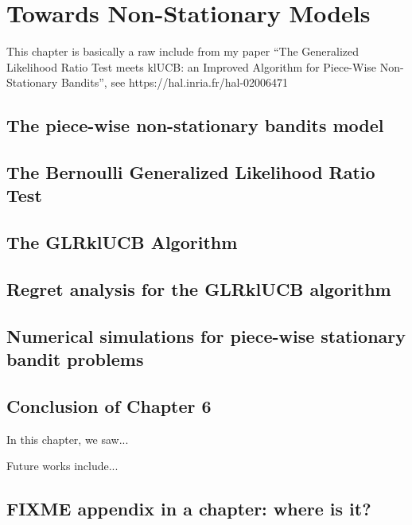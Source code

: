 

\chapter{Towards Non-Stationary Models}
\label{chapter:6}
\minitoc
\newpage
\graphicspath{{2-Chapters/6-Chapter/Images/}}

This chapter is basically a raw include from my paper ``The Generalized Likelihood Ratio Test meets klUCB: an Improved Algorithm for Piece-Wise Non-Stationary Bandits'', see https://hal.inria.fr/hal-02006471


\section{The piece-wise non-stationary bandits model}
\label{sec:6:piecewiseModel}


\section{The Bernoulli Generalized Likelihood Ratio Test}
\label{sec:6:piecewiseModel}


\section{The GLRklUCB Algorithm}
\label{sec:6:piecewiseModel}


\section{Regret analysis for the GLRklUCB algorithm}
\label{sec:6:piecewiseModel}


\section{Numerical simulations for piece-wise stationary bandit problems}
\label{sec:6:piecewiseModel}


\section{Conclusion of Chapter 6}
\label{sec:6:conclusion}

In this chapter, we saw...

Future works include...



\appendix

\section{FIXME appendix in a chapter: where is it?}

